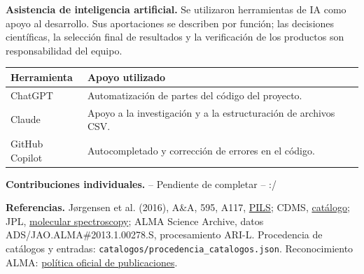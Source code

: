 \documentclass[10pt]{article}
\begin{document}
\textbf{Asistencia de inteligencia artificial.} Se utilizaron herramientas de IA como apoyo al desarrollo. Sus aportaciones se describen por función; las decisiones científicas, la selección final de resultados y la verificación de los productos son responsabilidad del equipo.

\begin{center}\small
\begin{tabularx}{\linewidth}{@{}l X@{}}
\toprule
Herramienta & Apoyo utilizado\\
\midrule
ChatGPT & Automatización de partes del código del proyecto.\\
Claude & Apoyo a la investigación y a la estructuración de archivos CSV.\\
GitHub Copilot & Autocompletado y corrección de errores en el código.\\
\bottomrule
\end{tabularx}
\end{center}

\textbf{Contribuciones individuales.} -- Pendiente de completar -- :/

\small
\textbf{Referencias.} Jørgensen et al. (2016), A\&A, 595, A117, \href{https://arxiv.org/abs/1607.08733}{PILS}; CDMS, \href{https://cdms.astro.uni-koeln.de/classic/entries/}{catálogo}; JPL, \href{https://spec.jpl.nasa.gov/}{molecular spectroscopy}; ALMA Science Archive, datos ADS/JAO.ALMA\#2013.1.00278.S, procesamiento ARI-L. Procedencia de catálogos y entradas: \texttt{catalogos/procedencia\_catalogos.json}. Reconocimiento ALMA: \href{https://almascience.eso.org/alma-data/publication-acknowledgement}{política oficial de publicaciones}.
\end{document}
